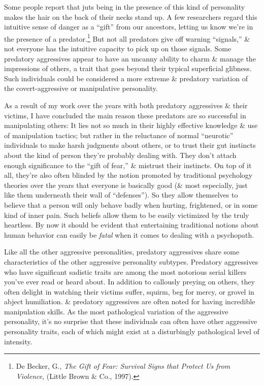 \documentclass{article}
\numberwithin{equation}{section}
\begin{document}
Some people report that juts being in the presence of this kind of personality makes the hair on the back of their necks stand up. A few researchers regard this intuitive sense of danger as a ``gift'' from our ancestors, letting us know we're in the presence of a predator.\footnote{De Becker, G., \textit{The Gift of Fear: Survival Signs that Protect Us from Violence}, (Little Brown \& Co., 1997).} But not all predators give off warning ``signals,'' \& not everyone has the intuitive capacity to pick up on those signals. Some predatory aggressives appear to have an uncanny ability to charm \& manage the impressions of others, a trait that goes beyond their typical superficial glibness. Such individuals could be considered a more extreme \& predatory variation of the covert-aggressive or manipulative personality.

As a result of my work over the years with both predatory aggressives \& their victims, I have concluded the main reason these predators are so successful in manipulating others: It lies not so much in their highly effective knowledge \& use of manipulation tactics; but rather in the reluctance of normal ``neurotic'' individuals to make harsh judgments about others, or to trust their gut instincts about the kind of person they're probably dealing with. They don't attach enough significance to the ``gift of fear,'' \& mistrust their instincts. On top of it all, they're also often blinded by the notion promoted by traditional psychology theories over the years that everyone is basically good (\& most especially, just like them underneath their wall of ``defenses''). So they allow themselves to believe that a person will only behave badly when hurting, frightened, or in some kind of inner pain. Such beliefs allow them to be easily victimized by the truly heartless. By now it should be evident that entertaining traditional notions about human behavior can easily be \textit{fatal} when it comes to dealing with a psychopath.

Like all the other aggressive personalities, predatory aggressives share some characteristics of the other aggressive personality subtypes. Predatory aggressives who have significant sadistic traits are among the most notorious serial killers you've ever read or heard about. In addition to callously preying on others, they often delight in watching their victims suffer, squirm, beg for mercy, or grovel in abject humiliation. \& predatory aggressives are often noted for having incredible manipulation skills. As the most pathological variation of the aggressive personality, it's no surprise that these individuals can often have other aggressive personality traits, each of which might exist at a disturbingly pathological level of intensity.
\end{document}
